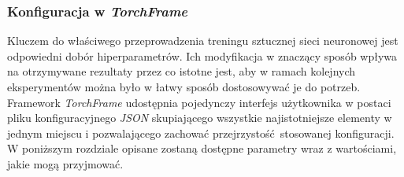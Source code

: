   \subsubsection{Konfiguracja w \textit{TorchFrame}}

    Kluczem do właściwego przeprowadzenia treningu sztucznej sieci neuronowej
    jest odpowiedni dobór hiperparametrów. Ich modyfikacja w znaczący sposób
    wpływa na otrzymywane rezultaty przez co istotne jest, aby w ramach
    kolejnych eksperymentów można było w łatwy sposób dostosowywać je do potrzeb.
    Framework \textit{TorchFrame} udostępnia pojedynczy interfejs użytkownika w postaci
    pliku konfiguracyjnego \textit{JSON} skupiającego wszystkie najistotniejsze
    elementy w jednym miejscu i pozwalającego zachować przejrzystość stosowanej
    konfiguracji. W poniższym rozdziale opisane zostaną dostępne parametry wraz
    z wartościami, jakie mogą przyjmować.

